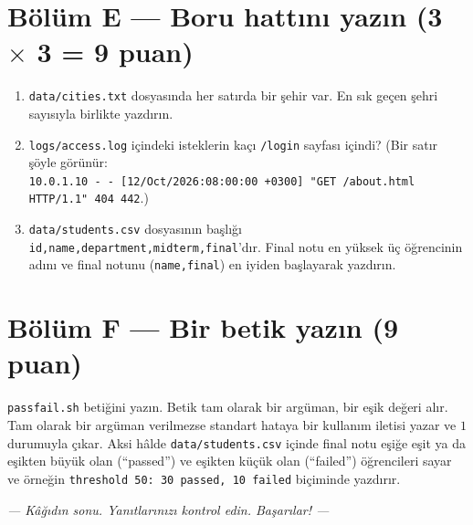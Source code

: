 \section*{Bölüm E --- Boru hattını yazın \hfill (3 $\times$ 3 = 9 puan)}
\begin{enumerate}[leftmargin=1.8em,label=E\arabic*.]
  \item \texttt{data/cities.txt} dosyasında her satırda bir şehir var. En sık geçen şehri sayısıyla birlikte yazdırın. \ans{1.1cm}
  \item \texttt{logs/access.log} içindeki isteklerin kaçı \texttt{/login} sayfası içindi? (Bir satır şöyle görünür:\\ \texttt{10.0.1.10 - - [12/Oct/2026:08:00:00 +0300] "GET /about.html HTTP/1.1" 404 442}.) \ans{1.1cm}
  \item \texttt{data/students.csv} dosyasının başlığı \texttt{id,name,department,midterm,final}'dır. Final notu en yüksek üç öğrencinin adını ve final notunu (\texttt{name,final}) en iyiden başlayarak yazdırın. \ans{1.1cm}
\end{enumerate}

\section*{Bölüm F --- Bir betik yazın \hfill (9 puan)}
\texttt{passfail.sh} betiğini yazın. Betik tam olarak bir argüman, bir eşik değeri alır. Tam olarak bir argüman verilmezse standart hataya bir kullanım iletisi yazar ve $1$ durumuyla çıkar. Aksi hâlde \texttt{data/students.csv} içinde final notu eşiğe eşit ya da eşikten büyük olan (``passed'') ve eşikten küçük olan (``failed'') öğrencileri sayar ve örneğin \texttt{threshold 50: 30 passed, 10 failed} biçiminde yazdırır.
\ans{9.0cm}

\begin{center}\itshape --- Kâğıdın sonu. Yanıtlarınızı kontrol edin. Başarılar! ---\end{center}
